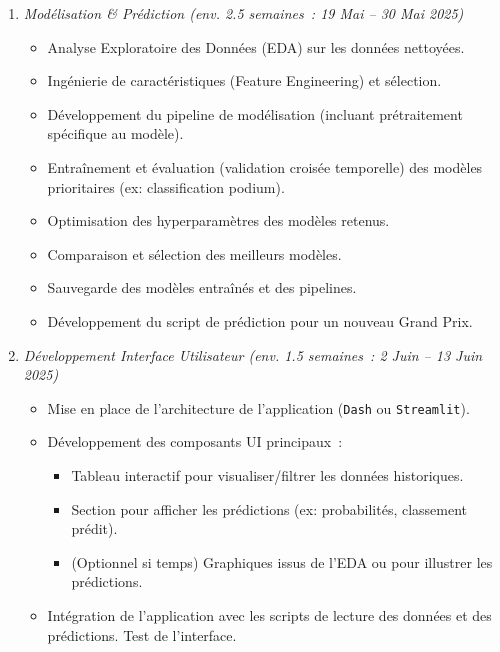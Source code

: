 \documentclass[11pt, a4paper]{article}
\newcommand{\lib}[1]{\texttt{#1}}
\begin{document}
\begin{enumerate}[label=Phase \arabic*:, wide, labelwidth=!, labelindent=0pt, leftmargin=*, itemsep=0.5em]
    \item \textit{Modélisation \& Prédiction (env. 2.5 semaines~: 19 Mai -- 30 Mai 2025)}
    \begin{itemize}[label=\textendash, itemsep=0.2em, leftmargin=*]
        \item Analyse Exploratoire des Données (EDA) sur les données nettoyées.
        \item Ingénierie de caractéristiques (Feature Engineering) et sélection.
        \item Développement du pipeline de modélisation (incluant prétraitement spécifique au modèle).
        \item Entraînement et évaluation (validation croisée temporelle) des modèles prioritaires (ex: classification podium).
        \item Optimisation des hyperparamètres des modèles retenus.
        \item Comparaison et sélection des meilleurs modèles. 
        \item Sauvegarde des modèles entraînés et des pipelines. 
        \item Développement du script de prédiction pour un nouveau Grand Prix.
    \end{itemize}

    \item \textit{Développement Interface Utilisateur (env. 1.5 semaines~: 2 Juin -- 13 Juin 2025)}
    \begin{itemize}[label=\textendash, itemsep=0.2em, leftmargin=*]
        \item Mise en place de l'architecture de l'application (\lib{Dash} ou \lib{Streamlit}). %
        \item Développement des composants UI principaux~:
            \begin{itemize}[label=*, itemsep=0.1em, leftmargin=1.5em]
                \item Tableau interactif pour visualiser/filtrer les données historiques.
                \item Section pour afficher les prédictions (ex: probabilités, classement prédit).
                \item (Optionnel si temps) Graphiques issus de l'EDA ou pour illustrer les prédictions. %
            \end{itemize}
        \item Intégration de l'application avec les scripts de lecture des données et des prédictions. Test de l'interface.
    \end{itemize}


\end{enumerate}
\end{document}
